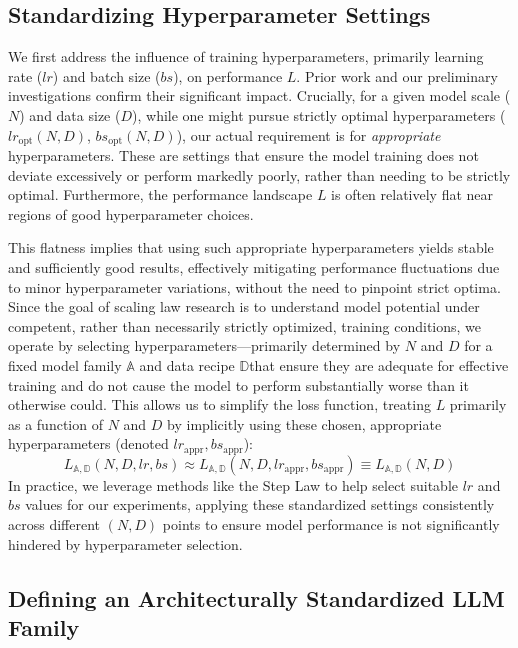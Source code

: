 \documentclass{article}
\begin{document}
\subsection{Standardizing Hyperparameter Settings} \label{appendix:opt_hyperparams}
We first address the influence of training hyperparameters, primarily learning rate ($lr$) and batch size ($bs$), on performance $L$. Prior work \cite{li2025predictable} and our preliminary investigations confirm their significant impact. Crucially, for a given model scale ($N$) and data size ($D$), while one might pursue strictly optimal hyperparameters ($lr_{\text{opt}}(N,D)$, $bs_{\text{opt}}(N,D)$), our actual requirement is for \textit{appropriate} hyperparameters. These are settings that ensure the model training does not deviate excessively or perform markedly poorly, rather than needing to be strictly optimal. Furthermore, the performance landscape $L$ is often relatively flat near regions of good hyperparameter choices.

This flatness implies that using such appropriate hyperparameters yields stable and sufficiently good results, effectively mitigating performance fluctuations due to minor hyperparameter variations, without the need to pinpoint strict optima. Since the goal of scaling law research is to understand model potential under competent, rather than necessarily strictly optimized, training conditions, we operate by selecting hyperparameters—primarily determined by $N$ and $D$ for a fixed model family $\mathbb{A}$ and data recipe $\mathbb{D}$that ensure they are adequate for effective training and do not cause the model to perform substantially worse than it otherwise could. This allows us to simplify the loss function, treating $L$ primarily as a function of $N$ and $D$ by implicitly using these chosen, appropriate hyperparameters (denoted $lr_{\text{appr}}, bs_{\text{appr}}$):
\begin{equation*}
    L_{\mathbb{A},\mathbb{D}}(N, D, lr, bs) \approx L_{\mathbb{A},\mathbb{D}}(N, D, lr_{\text{appr}}, bs_{\text{appr}}) \equiv L_{\mathbb{A},\mathbb{D}}(N, D)
\end{equation*}
In practice, we leverage methods like the Step Law \cite{li2025predictable} to help select suitable $lr$ and $bs$ values for our experiments, applying these standardized settings consistently across different $(N, D)$ points to ensure model performance is not significantly hindered by hyperparameter selection.


\subsection{Defining an Architecturally Standardized LLM Family} \label{sec:llm_family_std}
\end{document}
